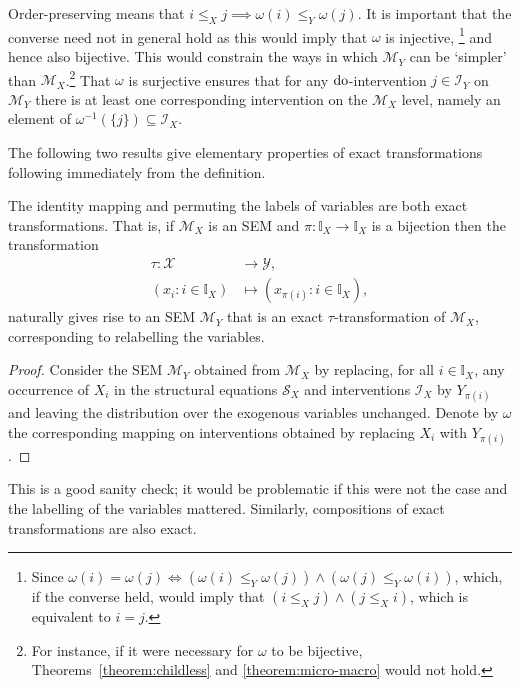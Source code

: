 Order-preserving means that ${i \leq_X j \implies \omega(i) \leq_Y \omega(j)}$.
It is important that the converse need not in general hold as this would imply that $\omega$ is injective,%
\footnote{Since ${\omega(i)=\omega(j) \iff \left(\omega(i) \leq_Y \omega(j)\right) \land \left(\omega(j) \leq_Y \omega(i)\right)}$, which, if the converse held, would imply that $\left(i \leq_X j\right) \land \left(j \leq_X i\right)$, which is equivalent to $i=j$.}
and hence also bijective.
This would constrain the ways in which $\mathcal{M}_Y$ can be `simpler' than $\mathcal{M}_X$.\footnote{For instance, if it were necessary for $\omega$ to be bijective, Theorems~\ref{theorem:childless} and \ref{theorem:micro-macro} would not hold.}
That $\omega$ is surjective ensures that for any $\operatorname{do}$-intervention $j \in \mathcal{I}_Y$ on $\mathcal{M}_Y$ there is at least one corresponding intervention on the $\mathcal{M}_X$ level, namely an element of $\omega^{-1}(\{j\}) \subseteq \mathcal{I}_X$.

The following two results give elementary properties of exact transformations following immediately from the definition.
\medskip

\begin{lemma}\label{lemma:elementary}
The identity mapping and permuting the labels of variables are both exact transformations.
That is, if $\mathcal{M}_X$ is an SEM and $\pi:\mathbb{I}_X \to \mathbb{I}_X$ is a bijection then the transformation
\begin{align*}
\tau:\mathcal{X}&\to\mathcal{Y},\\
(x_i:i\in\mathbb{I}_X) &\mapsto (x_{\pi(i)}:i\in\mathbb{I}_X),
\end{align*}
naturally gives rise to an SEM $\mathcal{M}_Y$ that is an exact $\tau$-transformation of $\mathcal{M}_X$, corresponding to relabelling the variables.
\end{lemma}

\begin{proof}
Consider the SEM $\mathcal{M}_Y$ obtained from $\mathcal{M}_X$ by replacing, for all $i\in\mathbb{I}_X$, any occurrence of $X_i$ in the structural equations $\mathcal{S}_X$ and interventions $\mathcal{I}_X$ by $Y_{\pi(i)}$ and leaving the distribution over the exogenous variables unchanged. Denote by $\omega$ the corresponding mapping on interventions obtained by replacing $X_i$ with $Y_{\pi(i)}$.
\end{proof}

This is a good sanity check; it would be problematic if this were not the case and the labelling of the variables mattered. Similarly, compositions of exact transformations are also exact.

